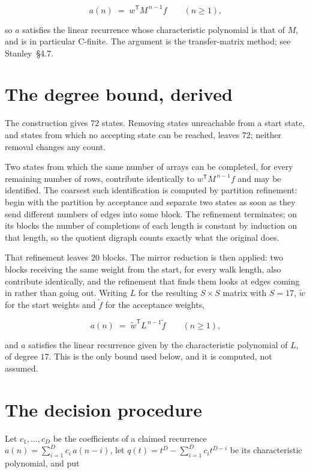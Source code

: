 \documentclass[11pt]{article}
\theoremstyle{definition}
\begin{document}
\[a(n) \;=\; w^{\mathsf T} M^{\,n-1} f \qquad (n \ge 1),\]

so $a$ satisfies the linear recurrence whose characteristic polynomial is that of $M$, and is in particular C-finite. The argument is the transfer-matrix method; see Stanley~\S4.7.

\section{The degree bound, derived}

The construction gives $72$ states. Removing states unreachable from a start state, and states from which no accepting state can be reached, leaves $72$; neither removal changes any count.

Two states from which the same number of arrays can be completed, for every remaining number of rows, contribute identically to $w^{\mathsf T}M^{\,n-1}f$ and may be identified. The coarsest such identification is computed by partition refinement: begin with the partition by acceptance and separate two states as soon as they send different numbers of edges into some block. The refinement terminates; on its blocks the number of completions of each length is constant by induction on that length, so the quotient digraph counts exactly what the original does.

That refinement leaves $20$ blocks. The mirror reduction is then applied: two blocks receiving the same weight from the start, for every walk length, also contribute identically, and the refinement that finds them looks at edges coming in rather than going out. Writing $L$ for the resulting $S \times S$ matrix with $S = 17$, $\tilde w$ for the start weights and $\tilde f$ for the acceptance weights,

\[a(n) \;=\; \tilde w^{\mathsf T} L^{\,n-1} \tilde f \qquad (n \ge 1),\]

and $a$ satisfies the linear recurrence given by the characteristic polynomial of $L$, of degree $17$. This is the only bound used below, and it is computed, not assumed.

\section{The decision procedure}

Let $c_1,\dots,c_D$ be the coefficients of a claimed recurrence $a(n) = \sum_{i=1}^{D} c_i\,a(n-i)$, let $q(t) = t^{D} - \sum_{i=1}^{D} c_i t^{D-i}$ be its characteristic polynomial, and put
\end{document}
